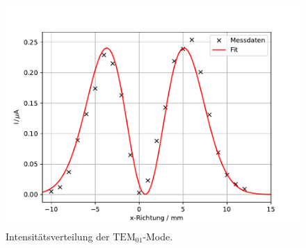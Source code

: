 \begin{figure}[h!]
  \centering
  \includegraphics[scale=0.7]{fig/plot3.pdf}
  \caption{Intensitätsverteilung der $\mathrm{TEM}_\mathrm{01}$-Mode.}
  \label{fig:T01}
\end{figure}

